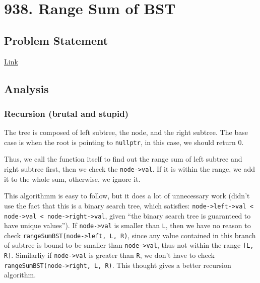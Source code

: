 \documentclass[11pt]{article}
\begin{document}
\section{938. Range Sum of BST}
\label{sec:org3b00563}
\subsection{Problem Statement}
\label{sec:org88f5702}
\href{https://leetcode.com/problems/range-sum-of-bst/}{Link}
\subsection{Analysis}
\label{sec:orgdf8264e}
\subsubsection{Recursion (brutal and stupid)}
\label{sec:orge63be74}
The tree is composed of left subtree, the node, and the right subtree. The base case is when the root is pointing to \texttt{nullptr}, in this case, we should return 0.

Thus, we call the function itself to find out the range sum of left subtree and right subtree first, then we check the \texttt{node->val}. If it is within the range, we add it to the whole sum, otherwise, we ignore it.

This algorithmm is easy to follow, but it does a lot of unnecessary work (didn't use the fact that this is a binary search tree, which satisfies: \texttt{node->left->val < node->val < node->right->val}, given ``the binary search tree is guaranteed to have unique values''). If \texttt{node->val} is smaller than \texttt{L}, then we have no reason to check \texttt{rangeSumBST(node->left, L, R)}, since any value contained in this branch of subtree is bound to be smaller than \texttt{node->val}, thus not within the range \texttt{[L, R]}. Similarliy if \texttt{node->val} is greater than \texttt{R}, we don't have to check \texttt{rangeSumBST(node->right, L, R)}. This thought gives a better recursion algorithm.
\end{document}
